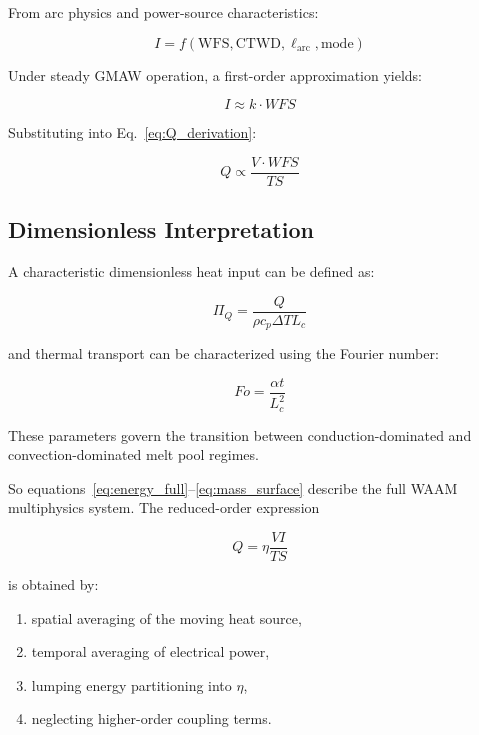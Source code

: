 \documentclass[conference]{IEEEtran}
\begin{document}
From arc physics and power-source characteristics:

\begin{equation}
I = f(\mathrm{WFS}, \mathrm{CTWD}, \ell_{\mathrm{arc}}, \text{mode})
\end{equation}

Under steady GMAW operation, a first-order approximation yields:

\begin{equation}
I \approx k \cdot WFS
\end{equation}

Substituting into Eq.~\eqref{eq:Q_derivation}:

\begin{equation}
Q \propto \frac{V \cdot WFS}{TS}
\label{eq:final_reduction}
\end{equation}

\subsection{Dimensionless Interpretation}

A characteristic dimensionless heat input can be defined as:

\begin{equation}
\Pi_Q = \frac{Q}{\rho c_p \Delta T L_c}
\end{equation}

and thermal transport can be characterized using the Fourier number:

\begin{equation}
Fo = \frac{\alpha t}{L_c^2}
\end{equation}

These parameters govern the transition between conduction-dominated and convection-dominated melt pool regimes.

So equations~\eqref{eq:energy_full}--\eqref{eq:mass_surface} describe the full WAAM multiphysics system. The reduced-order expression

\begin{equation}
Q = \eta \frac{V I}{TS}
\end{equation}

is obtained by:

\begin{enumerate}
\item spatial averaging of the moving heat source,
\item temporal averaging of electrical power,
\item lumping energy partitioning into $\eta$,
\item neglecting higher-order coupling terms.
\end{enumerate}
\end{document}
